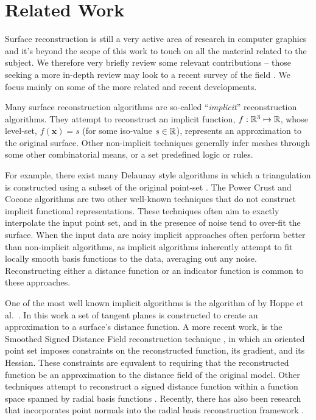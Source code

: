 \section{Related Work}
Surface reconstruction is still a very active area of research in computer 
graphics and it's beyond the scope of this work to touch on all the material 
related to the subject. We therefore very briefly review some relevant contributions -- 
those seeking a more in-depth review may look to a recent survey of the field 
\cite{reconstar_eg14}. We focus mainly on some of the more related and recent 
developments. 

Many surface reconstruction algorithms are so-called 
``\emph{implicit}'' reconstruction algorithms. They attempt to 
reconstruct an implicit function, $f : \mathbb{R}^3 \mapsto \mathbb{R} $, whose 
level-set, $f(\mathbf{x})=s$ (for some iso-value $s \in \mathbb{R}$), represents an
approximation to the original surface. Other non-implicit techniques
generally infer meshes through some other combinatorial means, 
or a set predefined logic or rules.

For example, there exist many Delaunay style algorithms in which a 
triangulation is constructed using a subset of the original point-set 
\cite{delaunay}. The Power Crust \cite{powercrust} and Cocone \cite{cocone} 
algorithms are two other well-known techniques that do not construct 
implicit functional representations. These techniques
often aim to exactly interpolate the input point set, and in the presence of
noise tend to over-fit the surface. When the input data are noisy
implicit approaches often perform better than non-implicit algorithms, 
as implicit algorithms inherently attempt to fit locally smooth basis 
functions to the data, averaging out any noise. Reconstructing either 
a distance function or an indicator function is common to these 
approaches.

One of the most well known implicit algorithms is the algorithm of 
by Hoppe et al.~\cite{hoppecut}. In this work a set of
tangent planes is constructed to create an approximation to a
surface's distance function. A more recent work, is the Smoothed
Signed Distance Field reconstruction technique \cite{ssdrecon}, in
which an oriented point set imposes constraints on the reconstructed
function, its gradient, and its Hessian. These constraints are
equvalent to requiring that the reconstructed function be an
approximation to the distance field of the original model. Other
techniques attempt to reconstruct a signed distance function within a
function space spanned by radial basis functions \cite{radial}.
Recently, there has also been research that incorporates point normals
into the radial basis reconstruction framework \cite{hermite}. 


